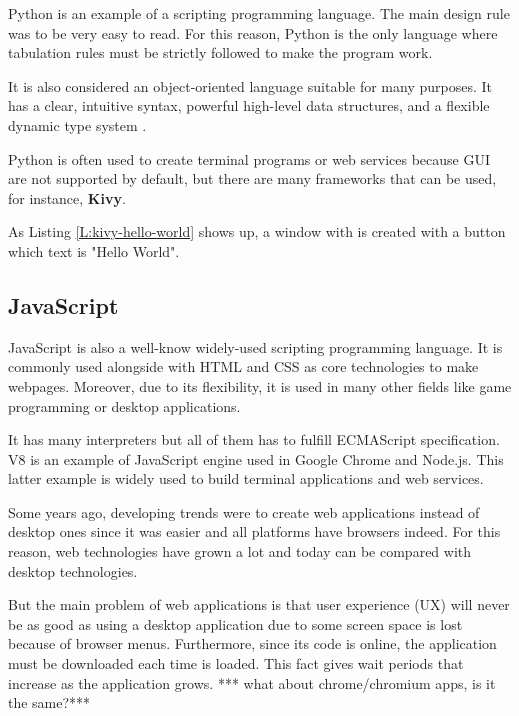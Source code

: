 Python is an example of a scripting programming language. The main design rule
was to be very easy to read. For this reason, Python is the only language where
tabulation rules must be strictly followed to make the program work.

It is also considered an object-oriented language suitable for many purposes.
It has a clear, intuitive syntax, powerful high-level data structures, and a
flexible dynamic type system \cite{An93pythonfor}.

Python is often used to create terminal programs or web services because GUI
are not supported by default, but there are many frameworks that can be used,
for instance, \textbf{Kivy}.

\begin{codefigure}
\end{codefigure}

As Listing \ref{L:kivy-hello-world} shows up, a window with is created with a
button which text is "Hello World".

\subsection{JavaScript}

JavaScript is also a well-know widely-used scripting programming language. It is commonly used
alongside with HTML and CSS as core technologies to make webpages. Moreover, due
to its flexibility, it is used in many other fields like game programming or
desktop applications.

It has many interpreters but all of them has to fulfill ECMAScript
specification. V8 is an example of JavaScript engine used in Google Chrome and
Node.js. This latter example is widely used to build terminal applications and
web services.

Some years ago, developing trends were to create web applications instead of
desktop ones since it was easier and all platforms have browsers indeed. For this
reason, web technologies have grown a lot and today can be compared with
desktop technologies.

But the main problem of web applications is that user experience (UX) will
never be as good as using a desktop application due to some screen space is
lost because of browser menus. Furthermore, since its code is online, the
application must be downloaded each time is loaded. This fact gives wait 
periods that increase as the application grows. *** what about chrome/chromium apps, is it the same?***

